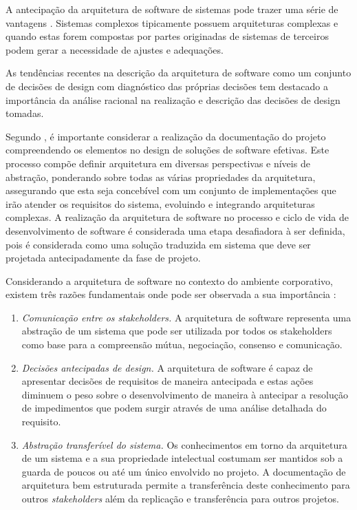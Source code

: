 A antecipação da arquitetura de software de sistemas pode trazer uma série de vantagens \cite{babar2013agile}. Sistemas complexos tipicamente possuem arquiteturas complexas e quando estas forem compostas por partes originadas de sistemas de terceiros podem gerar a necessidade de ajustes e adequações. 

As tendências recentes na descrição da arquitetura de software como um conjunto de decisões de design com diagnóstico das próprias decisões tem destacado a importância da análise racional na realização e descrição das decisões de design tomadas. \cite{babar2009software}

Segundo \cite{hanschke2015integrating}, é importante considerar a realização da documentação do projeto compreendendo os elementos no design de soluções de software efetivas. Este processo compõe definir arquitetura em diversas perspectivas e níveis de abstração, ponderando sobre todas as várias propriedades da arquitetura, assegurando que esta seja concebível com um conjunto de implementações que irão atender os requisitos do sistema, evoluindo e integrando arquiteturas complexas. A realização da arquitetura de software no processo e ciclo de vida de desenvolvimento de software é considerada uma etapa desafiadora à ser definida, pois é considerada como uma solução traduzida em sistema que deve ser projetada antecipadamente da fase de projeto. 

Considerando a arquitetura de software no contexto do ambiente corporativo, existem três razões fundamentais onde pode ser observada a sua importância \cite{bass2007software}:

\begin{enumerate}
    \item \textit{Comunicação entre os stakeholders.} A arquitetura de software representa uma abstração de um sistema que pode ser utilizada por todos os stakeholders como base para a compreensão mútua, negociação, consenso e comunicação. 
    \item \textit{Decisões antecipadas de design.} A arquitetura de software é capaz de apresentar decisões de requisitos de maneira antecipada e estas ações diminuem o peso sobre o desenvolvimento de maneira à antecipar a resolução de impedimentos que podem surgir através de uma análise detalhada do requisito.
    \item \textit{Abstração transferível do sistema.} Os conhecimentos em torno da arquitetura de um sistema e a sua propriedade intelectual costumam ser mantidos sob a guarda de poucos ou até um único envolvido no projeto. A documentação de arquitetura bem estruturada permite a transferência deste conhecimento para outros \textit{stakeholders} além da replicação e transferência para outros projetos.
    
\end{enumerate}


